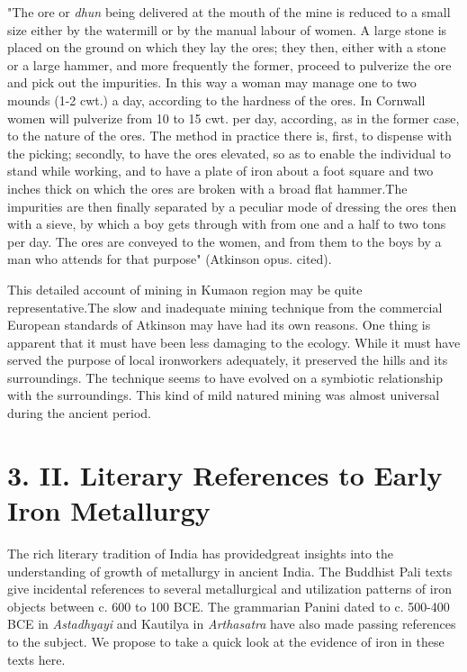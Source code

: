 \begin{myquote}
"The ore or \textit{dhun} being delivered at the mouth of the mine is reduced to a small size either by the watermill or by the manual labour of women. A large stone is placed on the ground on which they lay the ores; they then, either with a stone or a large hammer, and more frequently the former, proceed to pulverize the ore and pick out the impurities. In this way a woman may manage one to two mounds (1-2 cwt.) a day, according to the hardness of the ores. In Cornwall women will pulverize from 10 to 15 cwt. per day, according, as in the former case, to the nature of the ores. The method in practice there is, first, to dispense with the picking; secondly, to have the ores elevated, so as to enable the individual to stand while working, and to have a plate of iron about a foot square and two inches thick on which the ores are broken with a broad flat hammer.The impurities are then finally separated by a peculiar mode of dressing the ores then with a sieve, by which a boy gets through with from one and a half to two tons per day. The ores are conveyed to the women, and from them to the boys by a man who attends for that purpose" (Atkinson opus. cited).
\end{myquote}

This detailed account of mining in Kumaon region may be quite representative.The slow and inadequate mining technique from the commercial European standards of Atkinson may have had its own reasons. One thing is apparent that it must have been less damaging to the ecology. While it must have served the purpose of local ironworkers adequately, it preserved the hills and its surroundings. The technique seems to have evolved on a symbiotic relationship with the surroundings. This kind of mild natured mining was almost universal during the ancient period.


\section*{3. II. Literary References to Early Iron Metallurgy}

The rich literary tradition of India has providedgreat insights into the understanding of growth of metallurgy in ancient India. The Buddhist Pali texts give incidental references to several metallurgical and utilization patterns of iron objects between c. 600 to 100 BCE. The grammarian Panini dated to c. 500-400 BCE in \textit{Astadhyayi }and Kautilya in \textit{Arthasatra} have also made passing references to the subject. We propose to take a quick look at the evidence of iron in these texts here.

